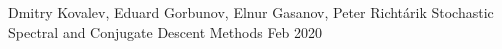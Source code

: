 
\begin{cventries}
	
	

\cventry
{Dmitry Kovalev, Eduard Gorbunov, Elnur Gasanov, Peter Richtárik} %
{Stochastic Spectral and Conjugate Descent Methods} %
{} 
{Feb 2020}
{\href{}{}}	



\end{cventries}